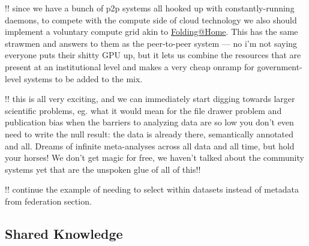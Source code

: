 \documentclass[10pt]{article}
\begin{document}
\begin{multicols}{2}
!! since we have a bunch of p2p systems all hooked up with
constantly-running daemons, to compete with the compute side of cloud
technology we also should implement a voluntary compute grid akin to
\href{https://foldingathome.org/}{Folding@Home}. This has the same
strawmen and answers to them as the peer-to-peer system --- no i'm not
saying everyone puts their shitty GPU up, but it lets us combine the
resources that are present at an institutional level and makes a very
cheap onramp for government-level systems to be added to the mix.

!! this is all very exciting, and we can immediately start digging
towards larger scientific problems, eg. what it would mean for the file
drawer problem and publication bias when the barriers to analyzing data
are so low you don't even need to write the null result: the data is
already there, semantically annotated and all. Dreams of infinite
meta-analyses across all data and all time, but hold your horses! We
don't get magic for free, we haven't talked about the community systems
yet that are the unspoken glue of all of this!!

!! continue the example of needing to select within datasets instead of
metadata from federation section. 
\end{multicols}


\hypertarget{shared-knowledge}{%
\subsection{Shared Knowledge}\label{shared-knowledge}}
\end{document}

